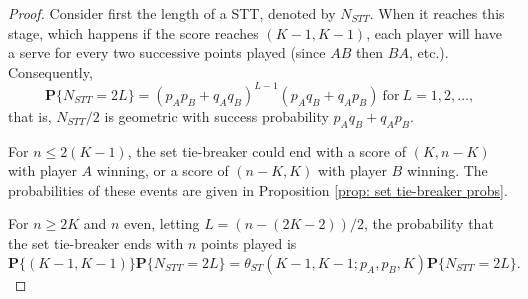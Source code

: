 \documentclass[11pt]{article}
\theoremstyle{plain}
\theoremstyle{definition}
\renewcommand{\Pr}{\mathbf{P}}
\begin{document}
\begin{proof}
    Consider first the length of a STT, denoted by $N_{STT}$. When it reaches this stage, which happens if the score reaches $(K-1,K-1)$, each player will have a serve for every two successive points played (since $AB$ then $BA$, etc.). Consequently,
    $$\Pr\{N_{STT} = 2L\} =  (p_Ap_B + q_Aq_B)^{L-1} (p_Aq_B + q_Ap_B) \ \mbox{for}\ L=1,2,\ldots,$$
    that is, $N_{STT}/2$ is geometric with success probability $p_Aq_B + q_Ap_B$.

    For $n \le 2(K-1)$, the set tie-breaker could end with a score of $(K,n-K)$ with player $A$ winning, or a score of $(n-K,K)$ with player $B$ winning. The probabilities of these events are given in Proposition \ref{prop: set tie-breaker probs}.

    For $n \ge 2K$ and $n$ even, letting $L = (n-(2K-2))/2$, the probability that the set tie-breaker ends with $n$ points played is
    $$\Pr\{(K-1,K-1)\} \Pr\{N_{STT} = 2L\} = \theta_{ST}(K-1,K-1;p_A,p_B,K) \Pr\{N_{STT} = 2L\}.$$
%
\end{proof}
\end{document}
